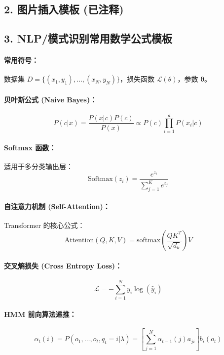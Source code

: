 \documentclass[a4paper, 11pt]{ctexart}
\begin{document}
\subsection*{2. 图片插入模板 (已注释)}

\subsection*{3. NLP/模式识别常用数学公式模板}

\paragraph{常用符号：}
数据集 $D = \{(x_1, y_1), \dots, (x_N, y_N)\}$，损失函数 $\mathcal{L}(\theta)$，参数 $\bm{\theta}$。

\paragraph{贝叶斯公式 (Naive Bayes)：}
$$ P(c|x) = \frac{P(x|c)P(c)}{P(x)} \propto P(c) \prod_{i=1}^{d} P(x_i|c) $$

\paragraph{Softmax 函数：}
适用于多分类输出层：
$$ \text{Softmax}(z_i) = \frac{e^{z_i}}{\sum_{j=1}^{K} e^{z_j}} $$

\paragraph{自注意力机制 (Self-Attention)：}
Transformer 的核心公式：
$$ \text{Attention}(Q, K, V) = \text{softmax}\left(\frac{QK^T}{\sqrt{d_k}}\right)V $$

\paragraph{交叉熵损失 (Cross Entropy Loss)：}
$$ \mathcal{L} = - \sum_{i=1}^{N} y_i \log(\hat{y}_i) $$

\paragraph{HMM 前向算法递推：}
$$ \alpha_t(i) = P(o_1, \dots, o_t, q_t=i|\lambda) = \left[ \sum_{j=1}^{N} \alpha_{t-1}(j) a_{ji} \right] b_i(o_t) $$
\end{document}

